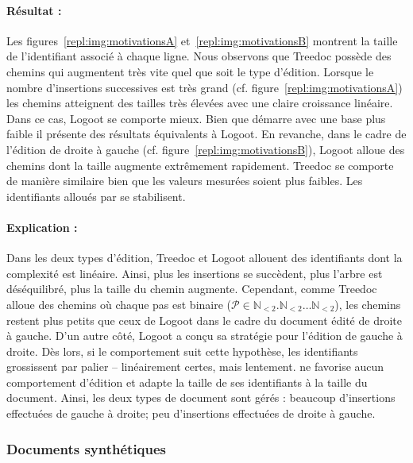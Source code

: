 \paragraph{Résultat :} Les figures~\ref{repl:img:motivationsA}
et~\ref{repl:img:motivationsB} montrent la taille de l'identifiant associé à
chaque ligne. Nous observons que Treedoc possède des chemins qui augmentent très
vite quel que soit le type d'édition. Lorsque le nombre d'insertions successives
est très grand (cf. figure~\ref{repl:img:motivationsA}) les chemins atteignent
des tailles très élevées avec une claire croissance linéaire. Dans ce cas,
Logoot se comporte mieux. Bien que \LSEQ démarre avec une base plus faible il
présente des résultats équivalents à Logoot. En revanche, dans le cadre de
l'édition de droite à gauche (cf. figure~\ref{repl:img:motivationsB}), Logoot
alloue des chemins dont la taille augmente extrêmement rapidement. Treedoc se
comporte de manière similaire bien que les valeurs mesurées soient plus
faibles. Les identifiants alloués par \LSEQ se stabilisent.


\paragraph{Explication :} Dans les deux types d'édition, Treedoc et Logoot
allouent des identifiants dont la complexité est linéaire. Ainsi, plus les
insertions se succèdent, plus l'arbre est déséquilibré, plus la taille du chemin
augmente. Cependant, comme Treedoc alloue des chemins où chaque pas est binaire
($\mathcal{P}\in \mathbb{N}_{<2}.\mathbb{N}_{<2}\ldots\mathbb{N}_{<2}$), les
chemins restent plus petits que ceux de Logoot dans le cadre du document édité
de droite à gauche. D'un autre côté, Logoot a conçu sa stratégie pour l'édition
de gauche à droite. Dès lors, si le comportement suit cette hypothèse, les
identifiants grossissent par palier -- linéairement certes, mais
lentement. \LSEQ ne favorise aucun comportement d'édition et adapte la taille de
ses identifiants à la taille du document. Ainsi, les deux types de document
sont gérés : beaucoup d'insertions effectuées de gauche à droite; peu
d'insertions effectuées de droite à gauche.


\subsubsection{Documents synthétiques}

